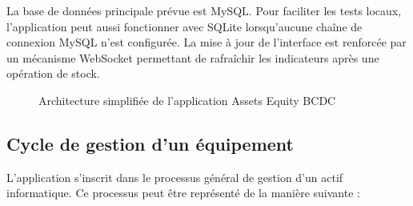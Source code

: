 \documentclass[12pt,a4paper]{report}
\begin{document}
La base de données principale prévue est MySQL. Pour faciliter les tests locaux, l'application peut aussi fonctionner avec SQLite lorsqu'aucune chaîne de connexion MySQL n'est configurée. La mise à jour de l'interface est renforcée par un mécanisme WebSocket permettant de rafraîchir les indicateurs après une opération de stock.

\begin{figure}[h!]
\centering
{}
\caption{Architecture simplifiée de l'application Assets Equity BCDC}
\end{figure}

\subsection{Cycle de gestion d'un équipement}

L'application s'inscrit dans le processus général de gestion d'un actif informatique. Ce processus peut être représenté de la manière suivante :
\end{document}
